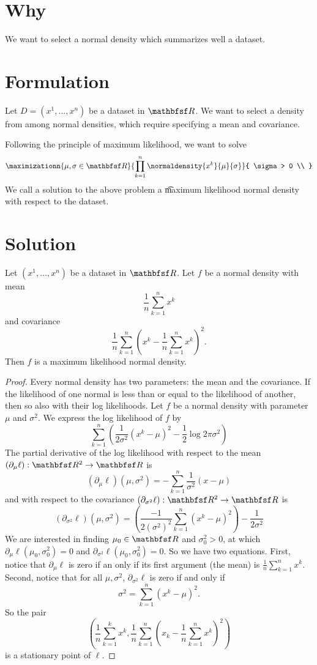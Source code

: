 
\section*{Why}

We want to select a normal density which summarizes well a dataset.

\section*{Formulation}

Let $D = (x^1, \dots , x^n)$ be a dataset in $\R $.
We want to select a density from among normal densities, which require specifying a mean and covariance.

Following the principle of maximum likelihood, we want to solve
\[
\maximizationn{\mu ,\sigma  \in \R }{
\prod_{k = 1}^{n} \normaldensity{x^k}{\mu }{\sigma }
}{
\sigma  > 0 \\
}
\]
We call a solution to the above problem a \t{maximum likelihood normal density} with respect to the dataset.

\section*{Solution}

\begin{proposition}
Let $(x^1, \dots , x^n)$ be a dataset in $\R $.
Let $f$ be a normal density with mean
\[
\frac{1}{n} \sum_{k = 1}^{n} x^k
\]
and covariance
\[
\frac{1}{n} \sum_{k = 1}^{n} \left(x^k - \frac{1}{n} \sum_{k = 1}^{n} x^k\right)^2.
\]
Then $f$ is a maximum likelihood normal density.
\end{proposition}

\begin{proof}Every normal density has two parameters: the mean and the covariance.
If the likelihood of one normal is less than or equal to the likelihood of another, then so also with their log likelihoods.
Let $f$ be a normal density with parameter $\mu $ and $\sigma ^2$.
We express the log likelihood of $f$ by
\[
\sum_{k = 1}^{n} \left( \frac{1}{2\sigma ^2}(x^k - \mu )^2 - \frac{1}{2}\log2\pi \sigma ^2\right)
\]
The partial derivative of the log likelihood with respect to the mean $(\partial_{\mu } \ell ): \R ^2 \to \R $ is
\[
(\partial_\mu  \ell )(\mu , \sigma ^2) = - \sum_{k = 1}^{n} \frac{1}{\sigma ^2}(x - \mu )
\]
and with respect to the covariance $(\partial_{\sigma ^2} \ell ): \R ^2 \to \R $ is
\[
(\partial_{\sigma ^2} \ell )(\mu , \sigma ^2) =
\left(\frac{-1}{2(\sigma ^2)^{2}}\sum_{k = 1}^{n}(x^k - \mu )^2\right)- \frac{1}{2\sigma ^2}
\]
We are interested in finding $\mu _0 \in \R $ and $\sigma ^2_0 > 0$, at which $\partial_\mu  \ell (\mu _0, \sigma ^2_0) = 0$ and $\partial_{\sigma ^2} \ell (\mu _0, \sigma ^2_0) = 0$.
So we have two equations.
First, notice that $\partial_\mu  \ell $ is zero if an only if its first argument (the mean) is $\frac{1}{n} \sum_{k = 1}^{n} x^k$.
Second, notice that for all $\mu , \sigma ^2$, $\partial_{\sigma ^2}\ell $ is zero if and only if
\[
\sigma ^2 = \sum_{k = 1}^{n} (x^k - \mu )^2.
\]
So the pair
\[
\left(\frac{1}{n}\sum_{k = 1}^{k} x^k, \frac{1}{n} \sum_{k = 1}^{n} (x_k - \frac{1}{n} \sum_{k = 1}^{n} x^k)^2\right)
\]
is a stationary point of $\ell $.\end{proof}